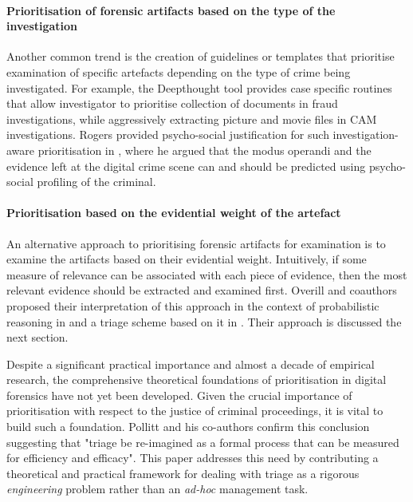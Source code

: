 \documentclass[10pt,a4paper]{article}
\begin{document}
\paragraph{Prioritisation of forensic artifacts based on the type of the investigation}

Another common trend is the creation of guidelines or templates that prioritise examination of specific artefacts depending on the type of crime being investigated. For example, the Deepthought tool \cite{shaw2013practical} provides case specific routines that allow investigator to prioritise collection of documents in fraud investigations, while aggressively extracting picture and movie files in CAM investigations.  Rogers provided psycho-social justification for such investigation-aware prioritisation in \cite{rogers2003role}, where he argued that the modus operandi and the evidence left at the digital crime scene can and should be predicted using psycho-social profiling of the criminal.

\paragraph{Prioritisation based on the evidential weight of the artefact}

An alternative approach to prioritising forensic artifacts for examination is to examine the artifacts based on their evidential weight. Intuitively, if some measure of relevance can be associated with each piece of evidence, then the most relevant evidence should be extracted and examined first.  Overill and coauthors proposed their interpretation of this approach in the context of probabilistic reasoning in \cite{overill2009cost} and a triage scheme based on it in \cite{overill2013triage}.  Their approach is discussed the next section.

Despite a significant practical importance and almost a decade of empirical research, the comprehensive theoretical foundations of prioritisation in digital forensics have not yet been developed.  Given the crucial importance of prioritisation with respect to the justice of criminal proceedings, it is vital to build such a foundation. Pollitt and his co-authors \cite{pollitt2013triage} confirm this conclusion suggesting that "triage be re-imagined as a formal process that can be measured for efficiency and efficacy". This paper addresses this need by contributing a theoretical and practical framework for dealing with triage as a rigorous \emph{engineering} problem rather than an \emph{ad-hoc} management task.
\end{document}
